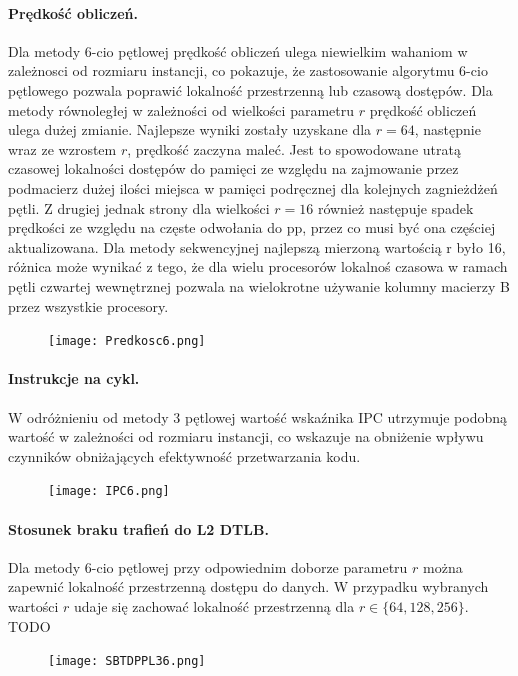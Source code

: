 \documentclass{scrartcl}
\begin{document}
\newpage
\paragraph{Prędkość obliczeń.} Dla metody 6-cio pętlowej prędkość obliczeń ulega niewielkim wahaniom w zależnosci od rozmiaru instancji, co pokazuje, że zastosowanie algorytmu 6-cio pętlowego pozwala poprawić lokalność przestrzenną lub czasową dostępów. Dla metody równoległej w zależności od wielkości parametru $r$ prędkość obliczeń ulega dużej zmianie. Najlepsze wyniki zostały uzyskane dla $r = 64$, następnie wraz ze wzrostem $r$, prędkość zaczyna maleć. Jest to spowodowane utratą czasowej lokalności dostępów do pamięci ze względu na zajmowanie przez podmacierz dużej ilości miejsca w pamięci podręcznej dla kolejnych zagnieżdżeń pętli. Z drugiej jednak strony dla wielkości $r = 16$ również następuje spadek prędkości ze względu na częste odwołania do pp, przez co musi być ona częściej aktualizowana. Dla metody sekwencyjnej najlepszą mierzoną wartością r było 16, różnica może wynikać z tego, że dla wielu procesorów lokalnoś czasowa w ramach pętli czwartej wewnętrznej pozwala na wielokrotne używanie kolumny macierzy B przez wszystkie procesory.
\begin{figure}[H]
\texttt{[image: Predkosc6.png]}\\
\end{figure}

\newpage
\paragraph{Instrukcje na cykl.} W odróżnieniu od metody 3 pętlowej wartość wskaźnika IPC utrzymuje podobną wartość w zależności od rozmiaru instancji, co wskazuje na obniżenie wpływu czynników obniżających efektywność przetwarzania kodu.
\begin{figure}[H]
\texttt{[image: IPC6.png]}\\
\end{figure}

\newpage
\paragraph{Stosunek braku trafień do L2 DTLB.} Dla metody 6-cio pętlowej przy odpowiednim doborze parametru $r$ można zapewnić lokalność przestrzenną dostępu do danych. W przypadku wybranych wartości $r$ udaje się zachować lokalność przestrzenną dla $r \in \{64, 128, 256\}$. TODO
\begin{figure}[H]
\texttt{[image: SBTDPPL36.png]}\\
\end{figure}
\end{document}

